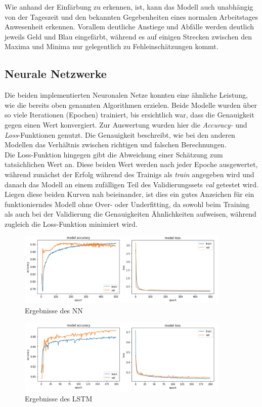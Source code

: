 Wie anhand der Einfärbung zu erkennen, ist, kann das Modell auch unabhängig von der Tageszeit und den bekannten
Gegebenheiten eines normalen Arbeitstages Anwesenheit erkennen. Vorallem deutliche Anstiege und Abfälle
werden deutlich jeweils Geld und Blau eingefärbt, während es auf einigen Strecken zwischen den Maxima und Minima
nur gelegentlich zu Fehleinschätzungen kommt.


\subsection{Neurale Netzwerke}
Die beiden implementierten Neuronalen Netze konnten eine ähnliche Leistung, wie die bereits oben genannten 
Algorithmen erzielen. Beide Modelle wurden über so viele Iterationen (Epochen) trainiert, bis ersichtlich war,
dass die Genauigkeit gegen einen Wert konvergiert. Zur Auswertung wurden hier die \textit{Accuracy-} und 
\textit{Loss}-Funktionen genutzt. Die Genauigkeit beschreibt, wie bei den anderen Modellen das Verhältnis
zwischen richtigen und falschen Berechnungen.\\
Die Loss-Funktion hingegen gibt die Abweichung einer Schätzung zum tatsächlichen Wert an. Diese beiden Wert 
werden nach jeder Epoche ausgewertet, während zunächst der Erfolg während des Trainigs als \textit{train}
angegeben wird und danach das Modell an einem zufälligen Teil des Validierungssets \textit{val} getestet wird.
Liegen diese beiden Kurven nah beieinander, ist dies ein gutes Anzeichen für ein funktionierndes Modell ohne 
Over- oder Underfitting, da sowohl beim Training als auch bei der Validierung die Genauigkeiten Ähnlichkeiten
aufweisen, während zugleich die Loss-Funktion minimiert wird.

\begin{figure}[h]
    \centering
    \includegraphics[width=0.9\textwidth]{pic/eval_NN.png}
    \caption{Ergebnisse des NN}
    \label{fig:PT_eval}
\end{figure}

\begin{figure}[h]
    \centering
    \includegraphics[width=0.9\textwidth]{pic/eval_LSTM.png}
    \caption{Ergebnisse des LSTM}
    \label{fig:PT_eval}
\end{figure}

